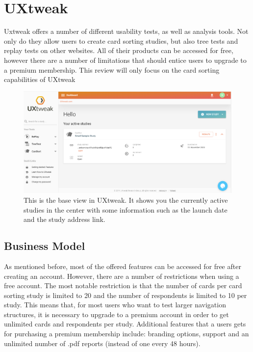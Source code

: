 \chapter{UXtweak}

\label{chap:UXtweak}


Uxtweak offers a number of different usability tests, as well as analysis tools.
Not only do they allow users to create card sorting studies, but also tree 
tests and replay tests on other websites. All of their products can be 
accessed for free, however there are a number of limitations that should entice
users to upgrade to a premium membership. This review will only focus on the
card sorting capabilities of UXtweak

\begin{figure}[tp] 
\centering
\includegraphics[keepaspectratio,width=\linewidth,height=\halfh]{images/uxtweak-dashboard.png}
\caption[UXtweak Application] { This is the base view in UXtweak.
It shows you the currently active studies in the center with some information 
such as the launch date and the study address link.
 }
\label{fig:UXtweak1}
\end{figure}

\section{Business Model}
As mentioned before, most of the offered features can be accessed for free after
 creating an account. However, there are  a number of restrictions when using a
free account. The most notable restriction is that the number of cards per card
sorting study is limited to 20 and the number of respondents is limited to 10 per
study. This means that, for most users who want to test larger navigation
structures, it is necessary to upgrade to a premium account in order to get 
unlimited cards and respondents per study. Additional features that a users gets
for purchasing a premium membership include: branding options, support and an
unlimited number of .pdf reports (instead of one every 48 hours).

